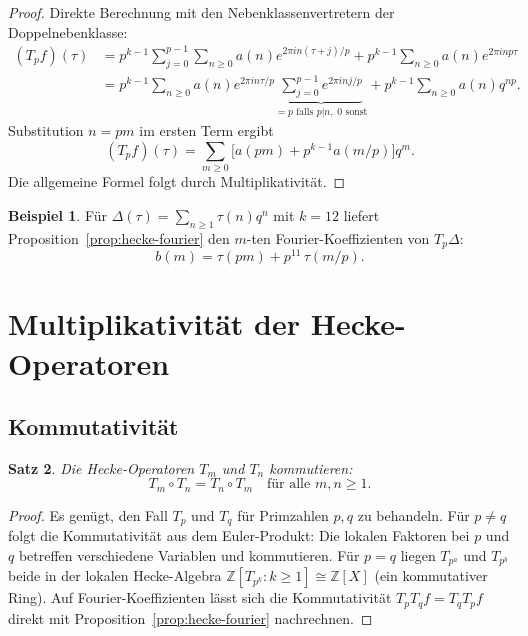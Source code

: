 \documentclass[12pt,a4paper]{amsart}
\newtheorem{theorem}{Satz}[section]
\theoremstyle{definition}
\newtheorem{beispiel}[theorem]{Beispiel}
\begin{document}
\begin{proof}
  Direkte Berechnung mit den Nebenklassenvertretern der Doppelnebenklasse:
  \begin{align*}
    (T_p f)(\tau)
    &= p^{k-1}\sum_{j=0}^{p-1}\sum_{n \ge 0} a(n) e^{2\pi in(\tau+j)/p}
       + p^{k-1}\sum_{n \ge 0} a(n) e^{2\pi inp\tau} \\
    &= p^{k-1}\sum_{n \ge 0} a(n) e^{2\pi in\tau/p}
       \underbrace{\sum_{j=0}^{p-1} e^{2\pi inj/p}}_{= p \text{ falls } p|n,\; 0 \text{ sonst}}
       + p^{k-1}\sum_{n \ge 0} a(n) q^{np}.
  \end{align*}
  Substitution $n = pm$ im ersten Term ergibt
  \[
    (T_p f)(\tau) = \sum_{m \ge 0}\bigl[a(pm) + p^{k-1}a(m/p)\bigr]q^m.
  \]
  Die allgemeine Formel folgt durch Multiplikativit\"at.
\end{proof}

\begin{beispiel}\label{ex:delta}
  F\"ur $\Delta(\tau) = \sum_{n \ge 1}\tau(n)q^n$ mit $k=12$ liefert
  Proposition~\ref{prop:hecke-fourier} den $m$-ten Fourier-Koeffizienten von $T_p\Delta$:
  \[
    b(m) = \tau(pm) + p^{11}\,\tau(m/p).
  \]
\end{beispiel}

\section{Multiplikativit\"at der Hecke-Operatoren}

\subsection{Kommutativit\"at}

\begin{theorem}\label{thm:kommut}
  Die Hecke-Operatoren $T_m$ und $T_n$ kommutieren:
  \[
    T_m \circ T_n = T_n \circ T_m \quad \text{f\"ur alle } m, n \ge 1.
  \]
\end{theorem}

\begin{proof}
  Es gen\"ugt, den Fall $T_p$ und $T_q$ f\"ur Primzahlen $p, q$ zu behandeln.
  F\"ur $p \ne q$ folgt die Kommutativit\"at aus dem Euler-Produkt: Die lokalen
  Faktoren bei $p$ und $q$ betreffen verschiedene Variablen und kommutieren.
  F\"ur $p = q$ liegen $T_{p^a}$ und $T_{p^b}$ beide in der lokalen Hecke-Algebra
  $\mathbb{Z}[T_{p^k} : k \ge 1] \cong \mathbb{Z}[X]$ (ein kommutativer Ring).
  Auf Fourier-Koeffizienten l\"asst sich die Kommutativit\"at $T_p T_q f = T_q T_p f$
  direkt mit Proposition~\ref{prop:hecke-fourier} nachrechnen.
\end{proof}
\end{document}
